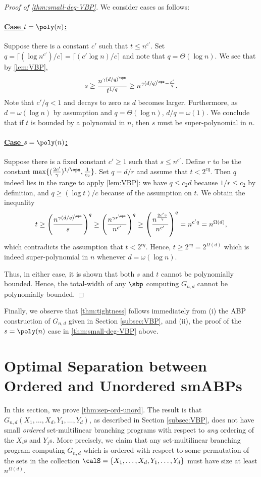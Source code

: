 \documentclass{article}
\begin{document}
\begin{proof}[Proof of \autoref{thm:small-deg-VBP}]
We consider cases as follows:
\paragraph{\underline{Case $t = \poly(n)$:}} Suppose there is a constant $c'$ such that $t\leq n^{c'}$. Set $q = \lceil(\log n^{c'})/c\rceil = \lceil (c'\log n)/c\rceil$ and note that $q = \Theta(\log n)$. We see that by \autoref{lem:VBP},
\[
s \geq \frac{n^{\gamma{({d/q})^\eps}}}{t^{1/q}}\geq n^{{\gamma (d/q)^\eps}- \frac{c'}{q}}.
\]
Note that $c'/q <1$ and decays to zero as $d$ becomes larger. Furthermore, as $d = \omega(\log n)$ by assumption and $q = \Theta(\log n)$, $d/q = \omega(1)$. We conclude that if $t$ is bounded by a polynomial in $n$, then $s$ must be super-polynomial in $n$.

\paragraph{\underline{Case $s = \poly(n)$:}} Suppose there is a fixed constant $c'\geq 1$ such that $s\leq n^{c'}$. Define $r$ to be the constant $ \max\{(\frac{2c'}{\gamma})^{1/\eps}, \frac{1}{c_2}\}$. Set $q = d/r$ and assume that $t<2^{cq}$. Then $q$ indeed lies in the range to apply \autoref{lem:VBP}: we have $q\leq c_2d$ because $1/r\leq c_2$ by definition, and $q\geq (\log t)/c$ because of the assumption on $t$. We obtain the inequality
\[
t\geq \left(\frac{n^{\gamma ({d/q})^\eps}}{s}\right)^q \geq \left(\frac{n^{{\gamma r^\eps}}}{n^{c'}}\right)^q\geq \left(\frac{n^{\frac{2c'\gamma }{\gamma}}}{n^{c'}}\right)^q = n^{c'q} = n^{\Omega(d)},
\]
which contradicts the assumption that $t<2^{cq}$. Hence, $t \geq 2^{cq} = 2^{\Omega(d)}$ which is indeed super-polynomial in $n$ whenever $d = \omega(\log n)$.

Thus, in either case, it is shown that both $s$ and $t$ cannot be polynomially bounded. Hence, the total-width of any $\sbp$ computing $G_{n,d}$ cannot be polynomially bounded.
\end{proof}

Finally, we observe that \autoref{thm:tightness} follows immediately from (i) the ABP construction of $G_{n,d}$ given in Section \ref{subsec:VBP}, and (ii), the proof of the $s = \poly(n)$ case in \autoref{thm:small-deg-VBP} above.


\section{Optimal Separation between Ordered and Unordered smABPs}\label{sec:opt-sep-sml-osml}
In this section, we prove \autoref{thm:sep-ord-unord}. The result is that $G_{n,d}(X_1,\ldots, X_d,Y_1,\ldots,Y_d)$, as described in Section \ref{subsec:VBP}, does not have small \emph{ordered} set-multilinear branching programs with respect to \emph{any} ordering of the $X_i$s and $Y_j$s. 
More precisely, we claim that any set-multilinear branching program computing $G_{n,d}$ which is ordered with respect to some permutation of the sets in the collection $\calS = \{X_1,\ldots, X_d,Y_1,\ldots,Y_d\}$ must have size at least $n^{\Omega(d)}$.
\end{document}
